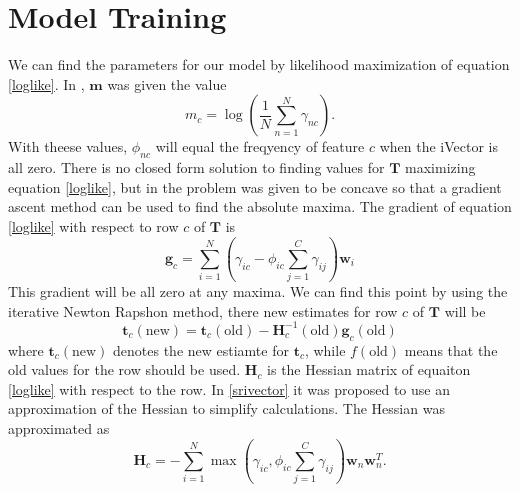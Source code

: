 \section{Model Training}
\label{sect:ivecttrain}

We can find the parameters for our model by likelihood maximization of equation \ref{loglike}. In \cite{lrivector}, $\mathbf{m}$ was given the value
\begin{equation}
\label{mest}
m_c=\log\left(\frac{1}{N} \sum_{n=1}^N \gamma_{nc}\right).
\end{equation} 
With theese values, $\phi_{nc}$ will equal the freqyency of feature $c$ when the iVector is all zero. There is no closed form solution to finding values for $\mathbf{T}$ maximizing equation \ref{loglike}, but in \cite{lrivector} the problem was given to be concave so that a gradient ascent method can be used to find the absolute maxima. The gradient of equation \ref{loglike} with respect to row $c$ of $\mathbf{T}$ is
\begin{equation}
\label{tgrad}
\mathbf{g}_c = \sum_{i=1}^N\left(\gamma_{ic} - \phi_{ic} \sum_{j=1}^C \gamma_{ij} \right) \mathbf{w}_i
\end{equation}
This gradient will be all zero at any maxima. We can find this point by using the iterative Newton Rapshon method, there new estimates for row $c$ of $\mathbf{T}$ will be
\begin{equation}
\label{tupdate}
\mathbf{t}_c(\text{new}) = \mathbf{t}_c(\text{old})-\mathbf{H}_c^{-1}(\text{old})\mathbf{g}_c(\text{old})
\end{equation}
where $\mathbf{t}_c(\text{new})$ denotes the new estiamte for $\mathbf{t}_c$, while $f(\text{old})$ means that the old values for the row should be used. $\mathbf{H}_c$ is the Hessian matrix of equaiton \ref{loglike} with respect to the row. In \ref{srivector} it was proposed to use an approximation of the Hessian to simplify calculations. The Hessian was approximated as
\begin{equation}
\label{thessian}
\mathbf{H}_c = -\sum_{i=1}^N \max\left(\gamma_{ic}, \phi_{ic} \sum_{j=1}^C \gamma_{ij}\right)\mathbf{w}_n \mathbf{w}_n^T.
\end{equation}

